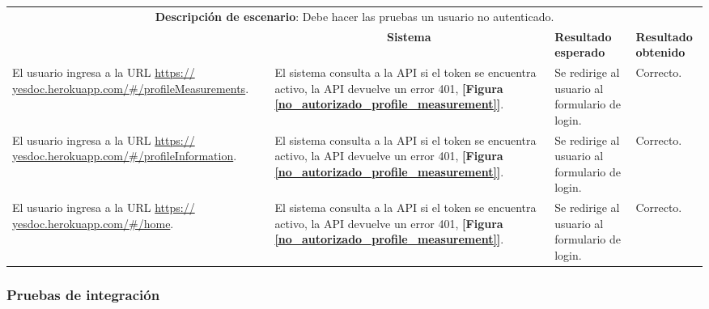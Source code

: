   \begin{center}
  	\begin{longtable}{|m{4cm}|m{4cm}|m{3cm}|m{2cm}|}
  		\hline \hline \rowcolor[gray]{0.9}
  		\multicolumn{4}{|c|}{\textbf{Procedimiento de pruebas}} \\
  		\hline 
  		
  		\multicolumn{4}{|c|}{\textbf{Descripción de escenario}: Debe hacer las pruebas un usuario no autenticado.} \\
  		\hline 
  		
  		\rowcolor[gray]{0.9}
  		\multicolumn{1}{|c|}{\textbf{Actor}} &
  		\multicolumn{1}{c|}{\textbf{Sistema}} &
  		\textbf{Resultado esperado}&
  		\textbf{Resultado obtenido} \\
  		\hline
  		El usuario ingresa a la URL \url{https:// yesdoc.herokuapp.com/#/profileMeasurements}.
  		&
  		El sistema consulta a la API si el token se encuentra activo, la API devuelve un error 401, \textbf{[Figura \ref{no_autorizado_profile_measurement}]}.
  		&
  		Se redirige al usuario al formulario de login.
  		&
  		Correcto.
  		\\ 
  		\hline
  		El usuario ingresa a la URL \url{https:// yesdoc.herokuapp.com/#/profileInformation}.
  		&
  		El sistema consulta a la API si el token se encuentra activo, la API devuelve un error 401, \textbf{[Figura \ref{no_autorizado_profile_measurement}]}.
  		&
  		Se redirige al usuario al formulario de login.
  		&
  		Correcto.
  		\\ 
  		\hline
  		El usuario ingresa a la URL \url{https:// yesdoc.herokuapp.com/#/home}.
  		&
  		El sistema consulta a la API si el token se encuentra activo, la API devuelve un error 401, \textbf{[Figura \ref{no_autorizado_profile_measurement}]}.
  		&
  		Se redirige al usuario al formulario de login.
  		&
  		Correcto.
  		\\ 
  		\hline
  		
  	\end{longtable}
  \end{center}
  \subsubsection{Pruebas de integración}
  
